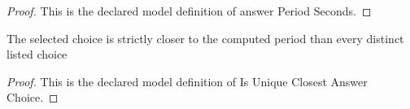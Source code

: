 \begin{proof}
  This is the declared model definition of answer Period Seconds.
\end{proof}
\begin{definition}
  \label{def:physics:phyx-mini-0266:phyxminiproblems-problemphyxmini0266-isuniqueclosestanswerchoice}
  The selected choice is strictly closer to the computed period than every distinct listed choice
\end{definition}
\begin{proof}
  This is the declared model definition of Is Unique Closest Answer Choice.
\end{proof}
